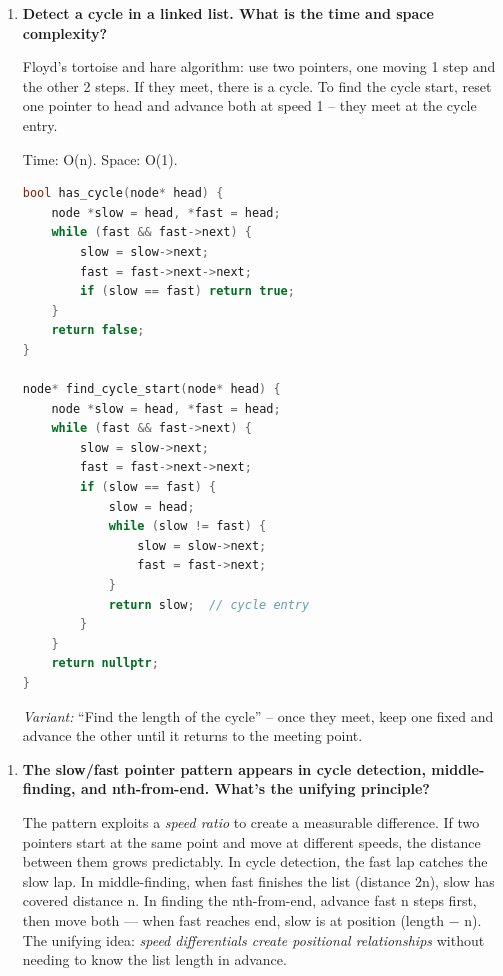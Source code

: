 \begin{enumerate}
\item \textbf{Detect a cycle in a linked list. What is the time and space complexity?}

Floyd's tortoise and hare algorithm: use two pointers, one moving 1 step and the other 2 steps. If they meet, there is a cycle. To find the cycle start, reset one pointer to head and advance both at speed 1 -- they meet at the cycle entry.

Time: O(n). Space: O(1).

\begin{lstlisting}[language=C++]
bool has_cycle(node* head) {
    node *slow = head, *fast = head;
    while (fast && fast->next) {
        slow = slow->next;
        fast = fast->next->next;
        if (slow == fast) return true;
    }
    return false;
}

node* find_cycle_start(node* head) {
    node *slow = head, *fast = head;
    while (fast && fast->next) {
        slow = slow->next;
        fast = fast->next->next;
        if (slow == fast) {
            slow = head;
            while (slow != fast) {
                slow = slow->next;
                fast = fast->next;
            }
            return slow;  // cycle entry
        }
    }
    return nullptr;
}
\end{lstlisting}

\textit{Variant:} ``Find the length of the cycle'' -- once they meet, keep one fixed and advance the other until it returns to the meeting point.
\end{enumerate}

\begin{enumerate}
\item \textbf{The slow/fast pointer pattern appears in cycle detection, middle-finding, and nth-from-end. What's the unifying principle?}

The pattern exploits a \textit{speed ratio} to create a measurable difference. If two pointers start at the same point and move at different speeds, the distance between them grows predictably. In cycle detection, the fast lap catches the slow lap. In middle-finding, when fast finishes the list (distance 2n), slow has covered distance n. In finding the nth-from-end, advance fast n steps first, then move both — when fast reaches end, slow is at position (length $-$ n). The unifying idea: \textit{speed differentials create positional relationships} without needing to know the list length in advance.
\end{enumerate}


